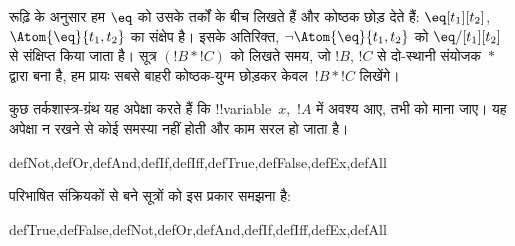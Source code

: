 \documentclass[../../../include/open-logic-section]{subfiles}
\begin{document}
रूढ़ि के अनुसार हम $\eq$ को उसके तर्कों के बीच लिखते हैं और कोष्ठक छोड़ देते
हैं: $\eq[t_1][t_2]$, $\Atom{\eq}{t_1,t_2}$ का संक्षेप है। इसके अतिरिक्त,
$\lnot \Atom{\eq}{t_1,t_2}$ को $\eq/[t_1][t_2]$ से संक्षिप्त किया जाता है।
सूत्र $(!B \ast !C)$ को लिखते समय, जो $!B$, $!C$ से दो-स्थानी
संयोजक~$\ast$ द्वारा बना है, हम प्रायः सबसे बाहरी कोष्ठक-युग्म छोड़कर
केवल~$!B \ast !C$ लिखेंगे।

\begin{intro}
कुछ तर्कशास्त्र-ग्रंथ यह अपेक्षा करते हैं कि !!{variable}~$x$,~$!A$ में
अवश्य आए, तभी
%
%
%
को
 माना जाए। यह अपेक्षा
न रखने से कोई समस्या नहीं होती और काम सरल हो जाता है।
\end{intro}

\begin{tagblock}{defNot,defOr,defAnd,defIf,defIff,defTrue,defFalse,defEx,defAll}
\begin{defn}
परिभाषित संक्रियकों से बने सूत्रों को इस प्रकार समझना है:

\begin{tagenumerate}{defTrue,defFalse,defNot,defOr,defAnd,defIf,defIff,defEx,defAll}









\end{tagenumerate}
\end{defn}
\end{tagblock}
\end{document}
